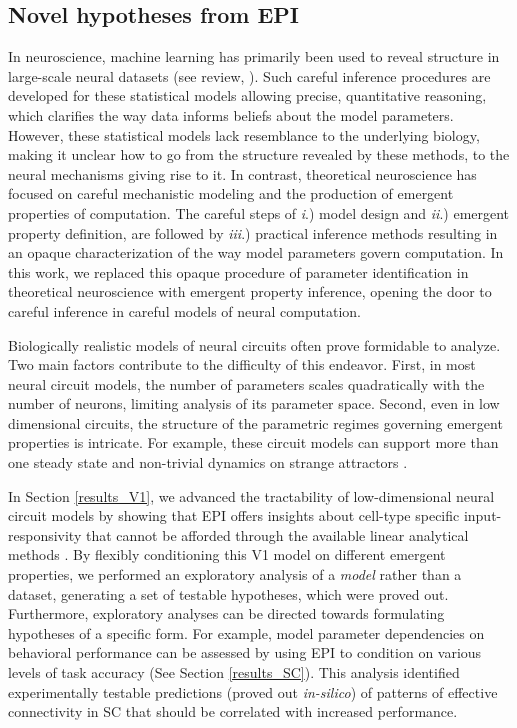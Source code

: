 \documentclass[11pt]{article}
\begin{document}
\subsection{Novel hypotheses from EPI} 
In neuroscience, machine learning has primarily been used to reveal structure in large-scale neural datasets \cite{kass2001spike, brown1998statistical, paninski2004maximum, truccolo2005point, druckmann2007novel, byron2009gaussian, park2011bayesian, latimer2015single, lakshminarasimhan2018dynamic, duncker2019learning, ladenbauer2019inferring} (see review, \cite{paninski2018neural}). 
 Such careful inference procedures are developed for these statistical models allowing precise, quantitative reasoning, which clarifies the way data informs beliefs about the model parameters.  
 However, these statistical models lack resemblance to the underlying biology, making it unclear how to go from the structure revealed by these methods, to the neural mechanisms giving rise to it. 
In contrast, theoretical neuroscience has focused on careful mechanistic modeling and the production of emergent properties of computation.  
The careful steps of \emph{i}.) model design and \emph{ii}.) emergent property definition, are followed by \emph{iii}.) practical inference methods resulting in an opaque characterization of the way model parameters govern computation.  
In this work, we replaced this opaque procedure of parameter identification in theoretical neuroscience with emergent property inference, opening the door to careful inference in careful models of neural computation.

Biologically realistic models of neural circuits often prove formidable to analyze.
Two main factors contribute to the difficulty of this endeavor.
First, in most neural circuit models, the number of parameters scales quadratically with the number of neurons, limiting analysis of its parameter space. 
Second, even in low dimensional circuits, the structure of the parametric regimes governing emergent properties is intricate.  
For example, these circuit models can support more than one steady state \cite{kraynyukova2018stabilized} and non-trivial dynamics on strange attractors \cite{morrison2016diversity}.

In Section \ref{results_V1}, we advanced the tractability of low-dimensional neural circuit models by showing that EPI offers insights about cell-type specific input-responsivity that cannot be afforded through the available linear analytical methods  \cite{litwin2016inhibitory, GarciaDelMolino2017, Chen2019}. 
By flexibly conditioning this V1 model on different emergent properties, we performed an exploratory analysis of a \emph{model} rather than a dataset, generating a set of testable hypotheses, which were proved out. 
Furthermore, exploratory analyses can be directed towards formulating hypotheses of a specific form. 
For example, model parameter dependencies on behavioral performance can be assessed by using EPI to condition on various levels of task accuracy (See Section \ref{results_SC}). 
This analysis identified experimentally testable predictions (proved out \textit{in-silico}) of patterns of effective connectivity in SC that should be correlated with increased performance.
\end{document}
